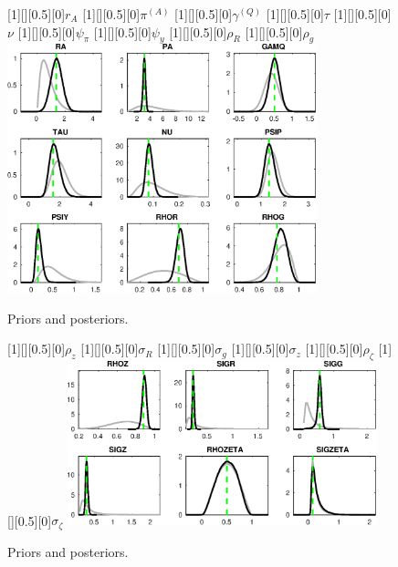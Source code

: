  
\begin{figure}[H]
[1][][0.5][0]{$ {r_{A}} $}
[1][][0.5][0]{$ {\pi^{(A)}} $}
[1][][0.5][0]{$ {\gamma^{(Q)}} $}
[1][][0.5][0]{$ {\tau} $}
[1][][0.5][0]{$ {\nu} $}
[1][][0.5][0]{$ {\psi_\pi} $}
[1][][0.5][0]{$ {\psi_y} $}
[1][][0.5][0]{$ {\rho_R} $}
[1][][0.5][0]{$ {\rho_{g}} $}
\centering
\includegraphics[width=0.80\textwidth]{AnSchoModTheBuilder/Output/AnSchoModTheBuilder_PriorsAndPosteriors1}
\caption{Priors and posteriors.}\label{Fig:PriorsAndPosteriors:1}
\end{figure}
 
\begin{figure}[H]
[1][][0.5][0]{$ {\rho_z} $}
[1][][0.5][0]{$ {\sigma_R} $}
[1][][0.5][0]{$ {\sigma_{g}} $}
[1][][0.5][0]{$ {\sigma_z} $}
[1][][0.5][0]{$ {\rho_\zeta} $}
[1][][0.5][0]{$ {\sigma_\zeta} $}
\centering
\includegraphics[width=0.80\textwidth]{AnSchoModTheBuilder/Output/AnSchoModTheBuilder_PriorsAndPosteriors2}
\caption{Priors and posteriors.}\label{Fig:PriorsAndPosteriors:2}
\end{figure}
 

